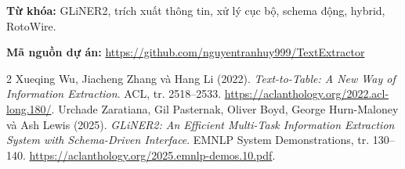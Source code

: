 \documentclass[12pt,a4paper]{article}
\begin{document}
\noindent\textbf{Từ khóa:} GLiNER2, trích xuất thông tin, xử lý cục bộ, schema động, hybrid, RotoWire.

\noindent\textbf{Mã nguồn dự án:} \url{https://github.com/nguyentranhuy999/TextExtractor}
\clearpage\setcounter{tocdepth}{2}\tableofcontents
\clearpage\listoffigures\listoftables
\clearpage{}



\clearpage
{}
\begin{thebibliography}{2}
 Xueqing Wu, Jiacheng Zhang và Hang Li (2022). \textit{Text-to-Table: A New Way of Information Extraction}. ACL, tr. 2518--2533. \url{https://aclanthology.org/2022.acl-long.180/}.
 Urchade Zaratiana, Gil Pasternak, Oliver Boyd, George Hurn-Maloney và Ash Lewis (2025). \textit{GLiNER2: An Efficient Multi-Task Information Extraction System with Schema-Driven Interface}. EMNLP System Demonstrations, tr. 130--140. \url{https://aclanthology.org/2025.emnlp-demos.10.pdf}.
\end{thebibliography}
\end{document}
